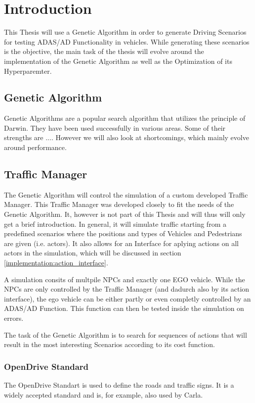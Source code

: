 \chapter{Introduction}
This Thesis will use a Genetic Algorithm in order to generate Driving Scenarios for testing ADAS/AD Functionality in vehicles.
While generating these scenarios is the objective, the main task of the thesis will evolve around the implementation of the Genetic Algorithm as well as the Optimization of its Hyperparemter.


\section{Genetic Algorithm}
Genetic Algorithms are a popular search algorithm that utilizes the principle of Darwin. They have been used successfully in various areas.
Some of their strengths are ....
However we will also look at shortcomings, which mainly evolve around performance.


\section{Traffic Manager}
The Genetic Algorithm will control the simulation of a custom developed Traffic Manager. This Traffic Manager was developed closely to fit the needs of the Genetic Algorithm. 
It, however is not part of this Thesis and will thus will only get a brief introduction. 
In general, it will simulate traffic starting from a predefined scenarios where the positions and types of Vehicles and Pedestrians are given (i.e. actors). It also allows for an Interface for aplying actions on all actors in the simulation, which will be discussed in section \ref{implementation:action_interface}.

A simulation consits of multpile NPCs and exactly one EGO vehicle. While the NPCs are only controlled by the Traffic Manager (and dadurch also by its action interface), the ego vehicle can be either partly or even completly controlled by an ADAS/AD Function. This function can then be tested inside the simulation on errors.



The task of the Genetic Algorithm is to search for sequences of actions that will result in the most interesting Scenarios according to its cost function.

\subsection{OpenDrive Standard}
The OpenDrive Standart is used to define the roads and traffic signs. It is a widely accepted standard and is, for example, also used by Carla.

